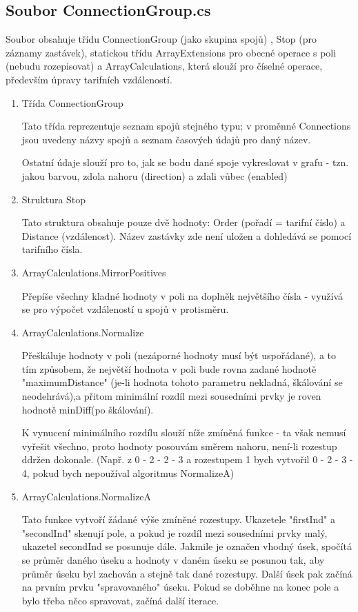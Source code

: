\documentclass[14pt]{article}
\begin{document}
\subsection{Soubor ConnectionGroup.cs}

Soubor obsahuje třídu ConnectionGroup (jako skupina spojů) , Stop (pro záznamy zastávek), statickou třídu ArrayExtensions pro obecné operace s poli (nebudu rozepisovat) a  ArrayCalculations, která slouží pro číselné operace, především úpravy tarifních vzdáleností.

\begin{enumerate}
\item Třída ConnectionGroup

Tato třída reprezentuje seznam spojů stejného typu; v proměnné Connections jsou uvedeny názvy spojů a seznam časových údajů pro daný název.

Ostatní údaje slouží pro to, jak se bodu dané spoje vykreslovat v grafu - tzn. jakou barvou, zdola nahoru (direction) a zdali vůbec (enabled)

\item Struktura Stop

Tato struktura obsahuje pouze dvě hodnoty: Order (pořadí = tarifní číslo) a Distance (vzdálenost). Název zastávky zde není uložen a dohledává se pomocí tarifního čísla.

\item ArrayCalculations.MirrorPositives

Přepíše všechny kladné hodnoty v poli na doplněk největšího čísla - využívá se pro výpočet vzdáleností u spojů v protisměru.

\item ArrayCalculations.Normalize

Přeškáluje hodnoty v poli (nezáporné hodnoty musí být uspořádané), a to tím způsobem, že největší hodnota v poli bude rovna zadané hodnotě "maximumDistance" (je-li hodnota tohoto parametru nekladná, škálování se neodehrává),a přitom minimální rozdíl mezi sousedními prvky je roven hodnotě minDiff(po škálování).

K vynucení minimálního rozdílu slouží níže zmíněná funkce - ta však nemusí vyřešit všechno, proto hodnoty posouvám směrem nahoru, není-li rozestup ddržen dokonale. (Např. z  0 - 2 - 2 - 3 a rozestupem 1 bych vytvořil 0 - 2 - 3 - 4, pokud bych nepoužíval algoritmus NormalizeA)

\item ArrayCalculations.NormalizeA

Tato funkce vytvoří žádané výše zmíněné rozestupy. Ukazetele "firstInd" a "secondInd" skenují pole, a pokud je rozdíl mezi sousedními prvky malý, ukazetel secondInd se posunuje dále. Jakmile je označen vhodný úsek, spočítá se průměr daného úseku a hodnoty v daném úseku se posunou tak, aby průměr úseku byl zachován a stejně tak dané rozestupy. Další úsek pak začíná na prvním prvku "spravovaného" úseku. Pokud se doběhne na konec pole a bylo třeba něco spravovat, začíná další iterace.


\end{enumerate}
\end{document}
